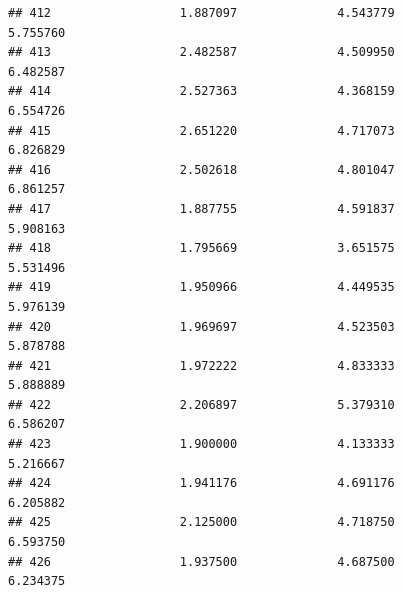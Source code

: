 \documentclass[]{article}
\newenvironment{Shaded}{\begin{snugshade}}{\end{snugshade}}
\newcommand{\CommentTok}[1]{\textcolor[rgb]{0.56,0.35,0.01}{\textit{#1}}}
\newcommand{\DecValTok}[1]{\textcolor[rgb]{0.00,0.00,0.81}{#1}}
\newcommand{\KeywordTok}[1]{\textcolor[rgb]{0.13,0.29,0.53}{\textbf{#1}}}
\newcommand{\NormalTok}[1]{#1}
\newcommand{\OperatorTok}[1]{\textcolor[rgb]{0.81,0.36,0.00}{\textbf{#1}}}
\newcommand{\StringTok}[1]{\textcolor[rgb]{0.31,0.60,0.02}{#1}}
\begin{document}
\begin{verbatim}
## 412                  1.887097              4.543779                 5.755760
## 413                  2.482587              4.509950                 6.482587
## 414                  2.527363              4.368159                 6.554726
## 415                  2.651220              4.717073                 6.826829
## 416                  2.502618              4.801047                 6.861257
## 417                  1.887755              4.591837                 5.908163
## 418                  1.795669              3.651575                 5.531496
## 419                  1.950966              4.449535                 5.976139
## 420                  1.969697              4.523503                 5.878788
## 421                  1.972222              4.833333                 5.888889
## 422                  2.206897              5.379310                 6.586207
## 423                  1.900000              4.133333                 5.216667
## 424                  1.941176              4.691176                 6.205882
## 425                  2.125000              4.718750                 6.593750
## 426                  1.937500              4.687500                 6.234375
\end{verbatim}

\begin{Shaded}
\end{Shaded}
\end{document}
